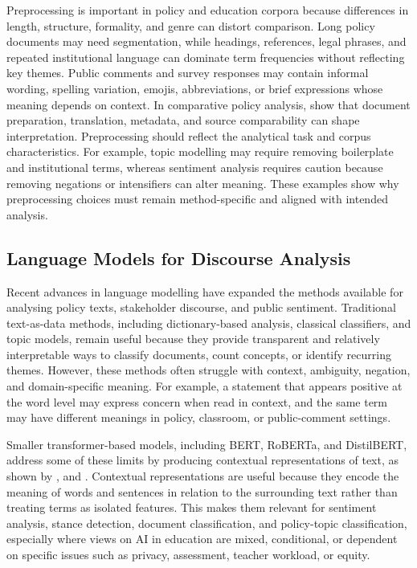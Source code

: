 Preprocessing is important in policy and education corpora because differences in
length, structure, formality, and genre can distort comparison. Long policy documents
may need segmentation, while headings, references, legal phrases, and repeated
institutional language can dominate term frequencies without reflecting key themes.
Public comments and survey responses may contain informal wording, spelling
variation, emojis, abbreviations, or brief expressions whose meaning depends on
context. In comparative policy analysis, \cite{lucas2015computer} show that document
preparation, translation, metadata, and source comparability can shape
interpretation. Preprocessing should reflect the analytical task and corpus
characteristics. For example, topic modelling may require removing boilerplate and
institutional terms, whereas sentiment analysis requires caution because removing
negations or intensifiers can alter meaning. These examples show why preprocessing
choices must remain method-specific and aligned with intended analysis.

\subsection{Language Models for Discourse Analysis}

Recent advances in language modelling have expanded the methods available for
analysing policy texts, stakeholder discourse, and public sentiment. Traditional
text-as-data methods, including dictionary-based analysis, classical classifiers, and
topic models, remain useful because they provide transparent and relatively
interpretable ways to classify documents, count concepts, or identify recurring
themes. However, these methods often struggle with context, ambiguity, negation, and
domain-specific meaning. For example, a statement that appears positive at the word
level may express concern when read in context, and the same term may have different
meanings in policy, classroom, or public-comment settings.

Smaller transformer-based models, including BERT, RoBERTa, and DistilBERT, address
some of these limits by producing contextual representations of text, as shown by
\cite{devlin2019bert}, \cite{liu2019roberta} and \cite{sanh2019distilbert}.
Contextual representations are useful because they encode the meaning of words and
sentences in relation to the surrounding text rather than treating terms as isolated
features. This makes them relevant for sentiment analysis, stance detection, document
classification, and policy-topic classification, especially where views on AI in
education are mixed, conditional, or dependent on specific issues such as privacy,
assessment, teacher workload, or equity.

